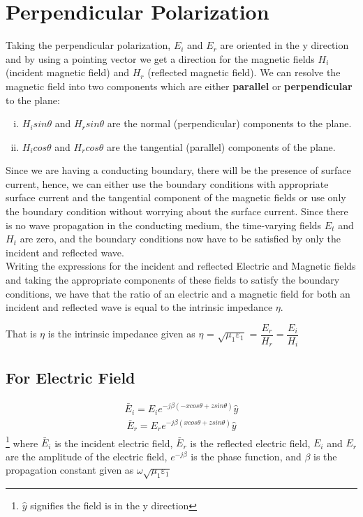 \section{Perpendicular Polarization}
Taking the perpendicular polarization, $E_i$ and $E_r$ are oriented in the y direction and by using a pointing vector we get a direction for the magnetic fields $H_i$ (incident magnetic field) and $H_r$ (reflected magnetic field). We can resolve the magnetic field into two
components which are either \textbf{parallel} or \textbf{perpendicular} to the plane:
\begin{enumerate}[(i)]
\item $ H_isin\theta $ and $ H_rsin\theta $  are the normal (perpendicular) components to the plane.
\item $ H_icos\theta $ and $ H_rcos\theta $ are the tangential (parallel) components of the plane.
\end{enumerate}
Since we are having a conducting boundary, there will be the presence of surface current, hence, we can either use the boundary conditions with appropriate surface current and the tangential component of the magnetic fields or use only the boundary condition without worrying about the surface current. Since there is no wave propagation in the conducting medium, the time-varying fields $E_t$ and $H_t$ are zero, and the boundary conditions now have to be satisfied by only the incident and reflected wave.\\ 
Writing the expressions for the incident and reflected Electric and Magnetic fields and taking the appropriate components of these fields
to satisfy the boundary conditions, we have that the ratio of an electric and a magnetic field for both an incident and reflected wave is equal to the intrinsic impedance $\eta $.

That is $ \eta $ is the intrinsic impedance given as $\eta $ = $\sqrt{\mu_1 \varepsilon_1 }$ = $\dfrac{E_r}{H_r} = \dfrac{E_i}{H_i}$
\subsection{For Electric Field}
\begin{align}
\bar{E}_i = E_i e^{-j\beta(-xcos\theta + zsin\theta)} \hat{y}
\label{eqn:elecincid}
\end{align}
\begin{align}
\bar{E}_r =E_r  e^{-j\beta ( xcos\theta + zsin\theta)} \hat{y}
\label{eqn:elecref}
\end{align}\footnote{$\hat{y}$ signifies the field is in the y direction}
where $\bar{E}_i$ is the incident electric field, $\bar{E}_r$ is the reflected electric field, $E_i$ and $E_r$ are the amplitude of the electric field, $e^{-j\beta}$ is the phase function, and $\beta$ is the propagation constant given as $\omega \sqrt{\mu_1\varepsilon_1}$ 


